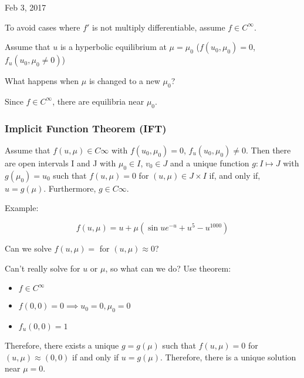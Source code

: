 \documentclass[main.tex]{subfiles}
\begin{document}
\hrulefill{}

Feb 3, 2017

\vspace{3mm}

To avoid cases where $f'$ is not multiply differentiable, assume $f\in C^\infty$.

Assume that $u$ is a hyperbolic equilibrium at $\mu = \mu_0$ ($f(u_0, \mu_0) = 0$, $f_u(u_0, \mu_0 \neq 0)$)

What happens when $\mu$ is changed to a new $\mu_0$?

Since $f \in C^\infty$, there are equilibria near $\mu_0$.

\subsubsection{Implicit Function Theorem (IFT)}
Assume that $f(u, \mu) \in C\infty$ with $f(u_0, \mu_0) = 0$, $f_u(u_0, \mu_0) \neq 0$. Then there are open intervals I and J with $\mu_0 \in I$, $v_0 \in J$ and a unique function $g : I \mapsto J$ with $g(\mu_0) = u_0$ such that $f(u, \mu) = 0$ for $(u, \mu) \in J\times I$ if, and only if, $u = g(\mu)$. Furthermore, $g\in C\infty$.

Example:

$$f(u, \mu) = u + \mu(\sin{u}e^{-u} + u^5 - u^{1000})$$

Can we solve $f(u, \mu) =$ for $(u, \mu) \approx 0$?

Can't really solve for $u$ or $\mu$, so what can we do? Use theorem:

\begin{itemize}
    \item $f\in C^\infty$
    \item $f(0, 0) = 0 \implies u_0 = 0, \mu_0 = 0$
    \item $f_u(0, 0) = 1$
\end{itemize}

Therefore, there exists a unique $g = g(\mu)$ such that $f(u, \mu) = 0$ for $(u, \mu) \approx (0, 0)$ if and only if $u = g(\mu)$. Therefore, there is a unique solution near $\mu = 0$.
\end{document}

